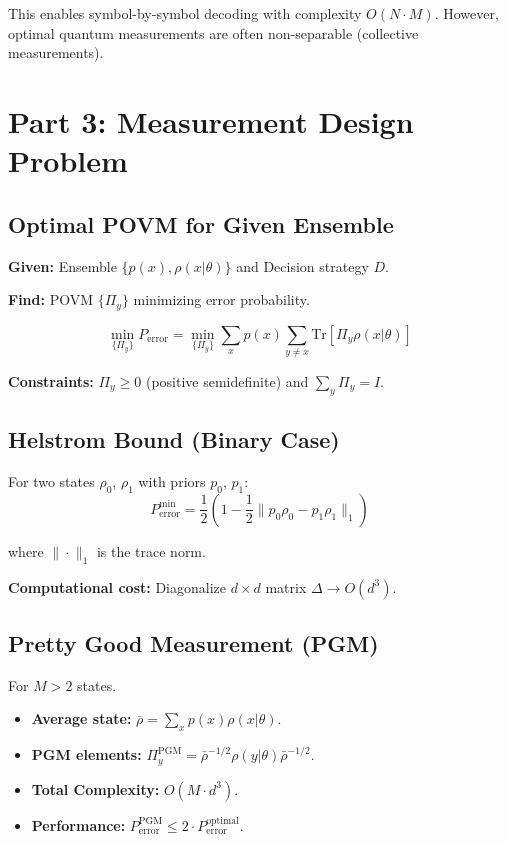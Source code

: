 \documentclass[11pt,a4paper]{article}
\begin{document}
This enables symbol-by-symbol decoding with complexity $O(N \cdot M)$. However, optimal quantum measurements are often non-separable (collective measurements).

\section{Part 3: Measurement Design Problem}

\subsection{Optimal POVM for Given Ensemble}

\textbf{Given:} Ensemble $\{p(x), \rho(x|\theta)\}$ and Decision strategy $D$.

\textbf{Find:} POVM $\{\Pi_y\}$ minimizing error probability.

\begin{equation}
\min_{\{\Pi_y\}} P_{\text{error}} = \min_{\{\Pi_y\}} \sum_x p(x) \sum_{y\neq x} \text{Tr}[\Pi_y\rho(x|\theta)]
\end{equation}

\textbf{Constraints:} $\Pi_y \geq 0$ (positive semidefinite) and $\sum_y \Pi_y = I$.

\subsection{Helstrom Bound (Binary Case)}

For two states $\rho_0$, $\rho_1$ with priors $p_0$, $p_1$:
\begin{equation}
P_{\text{error}}^{\min} = \frac{1}{2}\left(1 - \frac{1}{2}\|p_0\rho_0 - p_1\rho_1\|_1\right)
\end{equation}

where $\|\cdot\|_1$ is the trace norm. 

\textbf{Computational cost:} Diagonalize $d \times d$ matrix $\Delta \rightarrow O(d^3)$.

\subsection{Pretty Good Measurement (PGM)}

For $M > 2$ states.
\begin{itemize}
    \item \textbf{Average state:} $\bar{\rho} = \sum_x p(x)\rho(x|\theta)$.
    \item \textbf{PGM elements:} $\Pi_y^{\text{PGM}} = \bar{\rho}^{-1/2}\rho(y|\theta)\bar{\rho}^{-1/2}$.
    \item \textbf{Total Complexity:} $O(M \cdot d^3)$.
    \item \textbf{Performance:} $P_{\text{error}}^{\text{PGM}} \leq 2 \cdot P_{\text{error}}^{\text{optimal}}$.
\end{itemize}
\end{document}
